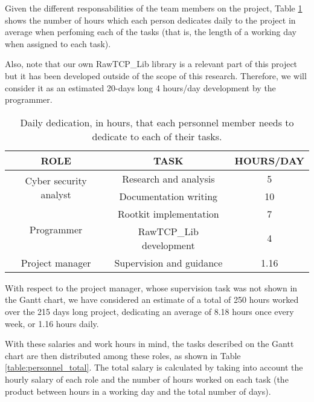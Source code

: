 Given the different responsabilities of the team members on the project, Table \ref{table:hours_personnel} shows the number of hours which each person dedicates daily  to the project in average when perfoming each of the tasks (that is, the length of a working day when assigned to each task). 

Also, note that our own RawTCP\_Lib library is a relevant part of this project but it has been developed outside of the scope of this research. Therefore, we will consider it as an estimated 20-days long 4 hours/day development by the programmer.

\begin{table}[htbp]
\begin{tabular}{|c|c|c|}
\hline
\textbf{ROLE} & \textbf{TASK} & \textbf{HOURS/DAY}\\
\hline
\hline
\multirow{2}{*}{Cyber security analyst} & \multicolumn{1}{c|}{Research and analysis} & \multicolumn{1}{c|}{5}\\
\cline{2-3}
& \multicolumn{1}{c|}{Documentation writing} & \multicolumn{1}{c|}{10} \\
\hline
\multirow{2}{*}{Programmer} & \multicolumn{1}{c|}{Rootkit implementation} & \multicolumn{1}{c|}{7} \\
\cline{2-3}
& \multicolumn{1}{c|}{RawTCP\_Lib development} & \multicolumn{1}{c|}{4} \\
\hline
Project manager & Supervision and guidance & 1.16 \\ 
\hline
\end{tabular}
\caption{Daily dedication, in hours, that each personnel member needs to dedicate to each of their tasks.}
\label{table:hours_personnel}
\end{table}

With respect to the project manager, whose supervision task was not shown in the Gantt chart, we have considered an estimate of a total of 250 hours worked over the 215 days long project, dedicating an average of 8.18 hours once every week, or 1.16 hours daily.

With these salaries and work hours in mind, the tasks described on the Gantt chart are then distributed among these roles, as shown in Table \ref{table:personnel_total}. The total salary is calculated by taking into account the hourly salary of each role and the number of hours worked on each task (the product between hours in a working day and the total number of days).

